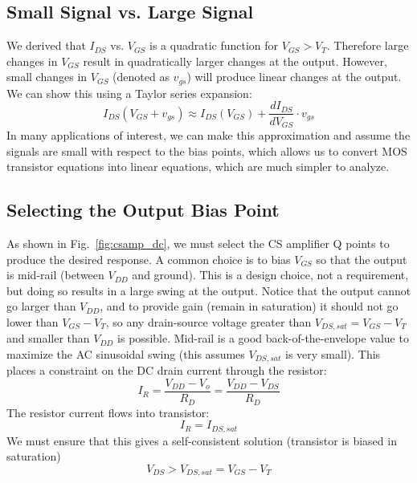 \subsection{Small Signal vs. Large Signal}

We derived that $I_{DS}$ vs. $V_{GS}$ is a quadratic function for $V_{GS} > V_T$.  Therefore large changes in $V_{GS}$ result in quadratically larger changes at the output.  However, small changes in $V_{GS}$ (denoted as $v_{gs}$) will produce linear changes at the output.  We can show this using a Taylor series expansion:
\begin{equation}
	{I_{DS}(V_{GS} + v_{gs})} \approx I_{DS} {(V_{GS})} + \frac{dI_{DS}}{dV_{GS}} \cdot v_{gs}  
\end{equation}
In many applications of interest, we can make this approximation and assume the signals are small with respect to the bias points, which allows us to convert MOS transistor equations into linear equations, which are much simpler to analyze.

 


\subsection{Selecting the Output Bias Point}




As shown in Fig.~\ref{fig:csamp_dc}, we must select the CS amplifier Q points to produce the desired response.  A common choice is to bias $V_{GS}$ so that the output is mid-rail (between $V_{DD}$ and ground).  This is a design choice, not a requirement, but doing so results in a large swing at the output.  Notice that the output cannot go larger than $V_{DD}$, and to provide gain (remain in saturation) it should not go lower than $V_{GS}-V_T$, so any drain-source voltage greater than $V_{DS,sat} = V_{GS}-V_T$ and smaller than $V_{DD}$ is possible.  Mid-rail is a good back-of-the-envelope value to maximize the AC sinusoidal swing (this assumes $V_{DS,sat}$ is very small).  This places a constraint on the DC drain current through the resistor:
%
\begin{equation}
	{I_R} = \frac{{{V_{DD}} - {V_o}}}{{{R_D}}} = \frac{{{V_{DD}} - {V_{DS}}}}{{{R_D}}}
\end{equation}
%
The resistor current flows into transistor:
%
\begin{equation}
	{I_R} = {I_{DS,sat}}
\end{equation}
%
We must ensure that this gives a self-consistent solution (transistor is biased in saturation)
%
\begin{equation}
	{V_{DS}} > V_{DS,sat} = {V_{GS}} - {V_T}
\end{equation}
%

